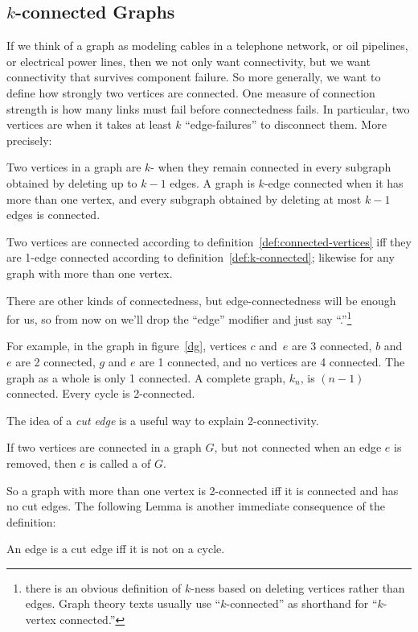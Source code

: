 \subsection{$k$-connected Graphs}

If we think of a graph as modeling cables in a telephone network, or
oil pipelines, or electrical power lines, then we not only want
connectivity, but we want connectivity that survives component
failure.  So more generally, we want to define how strongly two
vertices are connected.  One measure of connection strength is how
many links must fail before connectedness fails.  In particular, two
vertices are  when it takes at least $k$
``edge-failures'' to disconnect them.  More precisely:

\begin{definition}\label{def:k-connected}
Two vertices in a graph are $k$- when they remain
connected in every subgraph obtained by deleting up to $k-1$ edges.  A
graph is $k$-edge
connected when it has
more than one vertex, and every subgraph obtained by deleting at most
$k-1$ edges is connected.
\end{definition}
\iffalse
every two of its vertices are $k$-edge connected.
\fi

Two vertices are connected according to
definition~\ref{def:connected-vertices} iff they are 1-edge connected
according to definition~\ref{def:k-connected}; likewise for any graph
with more than one vertex.

There are other kinds of connectedness, but edge-connectedness will be
enough for us, so from now on we'll drop the ``edge'' modifier and
just say ``.''\footnote{there is an obvious definition
  of $k$-ness based on
  deleting vertices rather than edges.  Graph theory texts usually use
  ``$k$-connected'' as shorthand for ``$k$-vertex connected.''}

For example, in the graph in figure~\ref{dg}, vertices $c$ and~$e$ are
3 connected, $b$ and~$e$ are 2 connected, $g$ and $e$ are 1 connected,
and no vertices are 4 connected.  The graph as a whole is only 1
connected.  A complete graph, $k_n$, is $(n-1)$ connected.
Every cycle is 2-connected.

The idea of a \emph{cut edge} is a useful way to explain 2-connectivity.
\begin{definition}
If two vertices are connected in a graph $G$, but not connected when
an edge $e$ is removed, then $e$ is called a  of $G$.
\end{definition}
So a graph with more than one vertex is 2-connected iff it is
connected and has no cut edges.  The following Lemma is
another immediate consequence of the definition:
\begin{lemma}\label{lem:cutiffcycle}
An edge is a cut edge iff it is not on a cycle.
\end{lemma}

